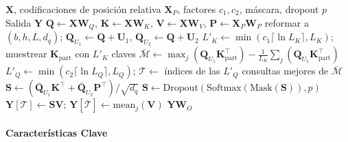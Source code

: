 \begin{algorithm}[H]
\caption{Atención auto-ProbSparse (forma de entrenamiento / paralela)}
\begin{algorithmic}[1]
\Require $\mathbf{X}$, codificaciones de posición relativa $\mathbf{X}_P$, factores $c_1,c_2$, máscara, dropout $p$
\Ensure Salida $\mathbf{Y}$
\State $\mathbf{Q}\gets\mathbf{X}\mathbf{W}_Q$, $\mathbf{K}\gets\mathbf{X}\mathbf{W}_K$, $\mathbf{V}\gets\mathbf{X}\mathbf{W}_V$, $\mathbf{P}\gets\mathbf{X}_P\mathbf{W}_P$
\State reformar a $(b,h,L,d_q)$; $\mathbf{Q}_{U_1}\gets\mathbf{Q}+\mathbf{U}_1$, $\mathbf{Q}_{U_2}\gets\mathbf{Q}+\mathbf{U}_2$
\State $L'_K \gets \min(c_1\lceil\ln L_K\rceil, L_K)$; muestrear $\mathbf{K}_{\text{part}}$ con $L'_K$ claves 
\State $\bar{\mathcal{M}} \gets \max_j(\mathbf{Q}_{U_1}\mathbf{K}_{\text{part}}^{\top}) - \frac{1}{L_K}\sum_j(\mathbf{Q}_{U_1}\mathbf{K}_{\text{part}}^{\top})$ 
\State $L'_Q \gets \min(c_2\lceil\ln L_Q\rceil, L_Q)$; $\mathcal{T}\gets$ índices de las $L'_Q$ consultas mejores de $\bar{\mathcal{M}}$
\State $\mathbf{S} \gets (\bar{\mathbf{Q}}_{U_1}\mathbf{K}^{\top} + \bar{\mathbf{Q}}_{U_2}\mathbf{P}^{\top})/\sqrt{d_q}$ 
\State $\mathbf{S} \gets \mathrm{Dropout}(\mathrm{Softmax}(\mathrm{Mask}(\mathbf{S})), p)$
\State $\mathbf{Y}[\mathcal{T}] \gets \mathbf{S}\mathbf{V}$; \quad $\mathbf{Y}[\overline{\mathcal{T}}] \gets \mathrm{mean}_j(\mathbf{V})$ 
\State \Return $\mathbf{Y}\mathbf{W}_O$
\end{algorithmic}
\end{algorithm}

\paragraph{Características Clave}

